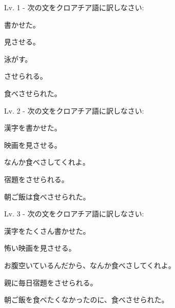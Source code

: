 	\newpage		
		
	\begin{mondai}{Lv. 1 - 次の文をクロアチア語に訳しなさい:}
		\item 書かせた。
		\item 見させる。
		\item 泳がす。
		\item させられる。
		\item 食べさせられた。
	\end{mondai}
		
	\begin{mondai}{Lv. 2 - 次の文をクロアチア語に訳しなさい:}
		\item 漢字を書かせた。
		\item 映画を見させる。
		\item なんか食べさしてくれよ。\footnotemark[1]
		\item 宿題をさせられる。
		\item 朝ご飯は食べさせられた。
	\end{mondai}
	
	\begin{mondai}{Lv. 3 - 次の文をクロアチア語に訳しなさい:}
		\item 漢字をたくさん書かせた。
		\item 怖い映画を見させる。
		\item お腹空いているんだから、なんか食べさしてくれよ。
		\item 親に毎日宿題をさせられる。
		\item 朝ご飯を食べたくなかったのに、食べさせられた。
	\end{mondai}

	

